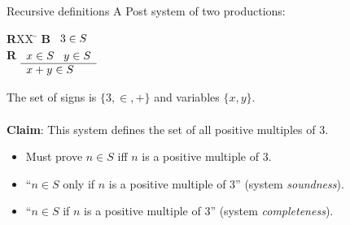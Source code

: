 \begin{wideslide}[bm=,toc=]{Recursive definitions}
A Post system of two productions:
\pause
\vspace{-1em}
\begin{tabbing}
{\bf R}XX \=  \kill
{\bf B} \>
        \(\begin{array}[t]{l}
        3\in S
        \end{array}\) \\[2ex]
\pause
{\bf R} \>
        \(\begin{array}[t]{l}
        x \in S \;\;\;y \in S \\
        \hline
        x + y \in S
        \end{array}\)
\end{tabbing}
\pause
The set of signs is $\{3,\in,+\}$ and variables $\{x,y\}$.\\~\\
\pause
\textbf{Claim}: This system defines the set of all positive multiples of 3.
\begin{itemize}
\item<6-> Must prove $n\in S$ iff $n$ is a positive multiple of 3.
\item<7-> ``$n\in S$ only if $n$ is a positive multiple of 3'' (system {\em soundness\/}).
\item<8-> ``$n\in S$ if $n$ is a positive multiple of 3'' (system {\em completeness\/}).
\end{itemize}
\end{wideslide}

